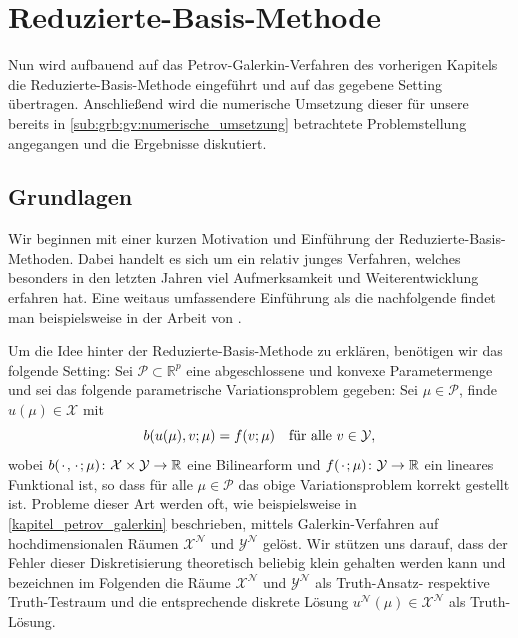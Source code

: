 \documentclass[../main.tex]{subfiles}
\begin{document}
\chapter{Reduzierte-Basis-Methode} %
\label{chapter:rbm}


Nun wird aufbauend auf das Petrov-Galerkin-Verfahren des vorherigen Kapitels die Reduzierte-Basis-Methode eingeführt und auf das gegebene Setting übertragen.
Anschließend wird die numerische Umsetzung dieser für unsere bereits in \cref{sub:grb:gv:numerische_umsetzung} betrachtete Problemstellung angegangen und die Ergebnisse diskutiert.

\section{Grundlagen} %
\label{sub:grb:rb:grundlagen}

Wir beginnen mit einer kurzen Motivation und Einführung der Reduzierte-Basis-Methoden.
Dabei handelt es sich um ein relativ junges Verfahren, welches besonders in den letzten Jahren viel Aufmerksamkeit und Weiterentwicklung erfahren hat.
Eine weitaus umfassendere Einführung als die nachfolgende findet man beispielsweise in der Arbeit von \textcite{Patera:2007un}.

Um die Idee hinter der Reduzierte-Basis-Methode zu erklären, benötigen wir das folgende Setting: Sei $\mathcal P \subset \mathbb{R}^{p}$ eine abgeschlossene und konvexe Parametermenge und sei das folgende parametrische Variationsproblem gegeben:
Sei $\mu \in \mathcal P$, finde $u(\mu) \in \mathcal X$ mit
\begin{equation}
    \label{eq:rbm_varprob_allgemein}
    b(u(\mu), v; \mu) = f(v; \mu) \quad \fa v \in \mathcal Y,
\end{equation}
wobei $b({\mkern2mu\cdot\mkern2mu}, {\mkern2mu\cdot\mkern2mu}; \mu) \colon \mathcal X \times \mathcal Y \to \mathbb{R}$ eine Bilinearform und $f({\mkern2mu\cdot\mkern2mu}; \mu) \colon \mathcal Y \to \mathbb{R}$ ein lineares Funktional ist, so dass für alle $\mu \in \mathcal P$ das obige Variationsproblem korrekt gestellt ist.
Probleme dieser Art werden oft, wie beispielsweise in \autoref{kapitel_petrov_galerkin} beschrieben, mittels Galerkin-Verfahren auf hochdimensionalen Räumen $\mathcal X^{\mathcal N}$ und $\mathcal Y^{\mathcal N}$ gelöst.
Wir stützen uns darauf, dass der Fehler dieser Diskretisierung theoretisch beliebig klein gehalten werden kann und bezeichnen im Folgenden die Räume $\mathcal X^{\mathcal N}$ und $\mathcal Y^{\mathcal N}$ als Truth-Ansatz- respektive Truth-Testraum und die entsprechende diskrete Lösung $u^{\mathcal N}(\mu) \in \mathcal X^{\mathcal N}$ als Truth-Lösung.
\end{document}
